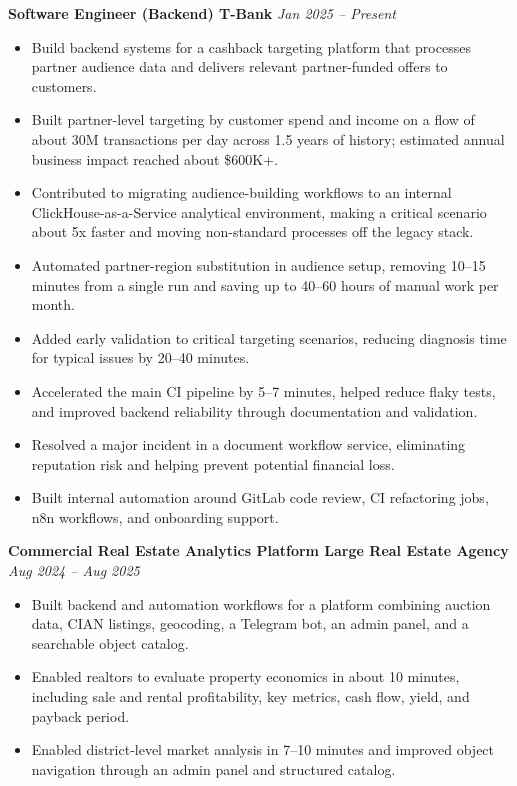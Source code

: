 \documentclass[10pt,a4paper]{article}
\begin{document}
\textbf{Software Engineer (Backend) \textbar{} T-Bank} \hfill \textit{Jan 2025 -- Present}
\begin{itemize}
  \item Build backend systems for a cashback targeting platform that processes partner audience data and delivers relevant partner-funded offers to customers.
  \item Built partner-level targeting by customer spend and income on a flow of about 30M transactions per day across 1.5 years of history; estimated annual business impact reached about \$600K+.
  \item Contributed to migrating audience-building workflows to an internal ClickHouse-as-a-Service analytical environment, making a critical scenario about 5x faster and moving non-standard processes off the legacy stack.
  \item Automated partner-region substitution in audience setup, removing 10--15 minutes from a single run and saving up to 40--60 hours of manual work per month.
  \item Added early validation to critical targeting scenarios, reducing diagnosis time for typical issues by 20--40 minutes.
  \item Accelerated the main CI pipeline by 5--7 minutes, helped reduce flaky tests, and improved backend reliability through documentation and validation.
  \item Resolved a major incident in a document workflow service, eliminating reputation risk and helping prevent potential financial loss.
  \item Built internal automation around GitLab code review, CI refactoring jobs, n8n workflows, and onboarding support.
\end{itemize}

\textbf{Commercial Real Estate Analytics Platform \textbar{} Large Real Estate Agency} \hfill \textit{Aug 2024 -- Aug 2025}
\begin{itemize}
  \item Built backend and automation workflows for a platform combining auction data, CIAN listings, geocoding, a Telegram bot, an admin panel, and a searchable object catalog.
  \item Enabled realtors to evaluate property economics in about 10 minutes, including sale and rental profitability, key metrics, cash flow, yield, and payback period.
  \item Enabled district-level market analysis in 7--10 minutes and improved object navigation through an admin panel and structured catalog.
\end{itemize}
\end{document}
